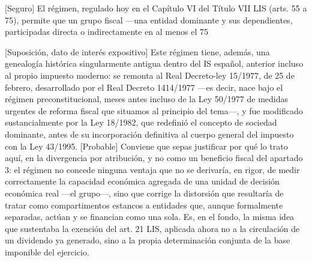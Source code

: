 \documentclass[10pt,a4paper]{article}
\begin{document}
[Seguro] El régimen, regulado hoy en el Capítulo VI del Título VII LIS (arts. 55 a 75), permite que un grupo fiscal —una entidad dominante y sus dependientes, participadas directa o indirectamente en al menos el 75%

[Suposición, dato de interés expositivo] Este régimen tiene, además, una genealogía histórica singularmente antigua dentro del IS español, anterior incluso al propio impuesto moderno: se remonta al Real Decreto-ley 15/1977, de 25 de febrero, desarrollado por el Real Decreto 1414/1977 —es decir, nace bajo el régimen preconstitucional, meses antes incluso de la Ley 50/1977 de medidas urgentes de reforma fiscal que situamos al principio del tema—, y fue modificado sustancialmente por la Ley 18/1982, que redefinió el concepto de sociedad dominante, antes de su incorporación definitiva al cuerpo general del impuesto con la Ley 43/1995. [Probable] Conviene que sepas justificar por qué lo trato aquí, en la divergencia por atribución, y no como un beneficio fiscal del apartado 3: el régimen no concede ninguna ventaja que no se derivaría, en rigor, de medir correctamente la capacidad económica agregada de una unidad de decisión económica real —el grupo—, sino que corrige la distorsión que resultaría de tratar como compartimentos estancos a entidades que, aunque formalmente separadas, actúan y se financian como una sola. Es, en el fondo, la misma idea que sustentaba la exención del art. 21 LIS, aplicada ahora no a la circulación de un dividendo ya generado, sino a la propia determinación conjunta de la base imponible del ejercicio.
\end{document}
